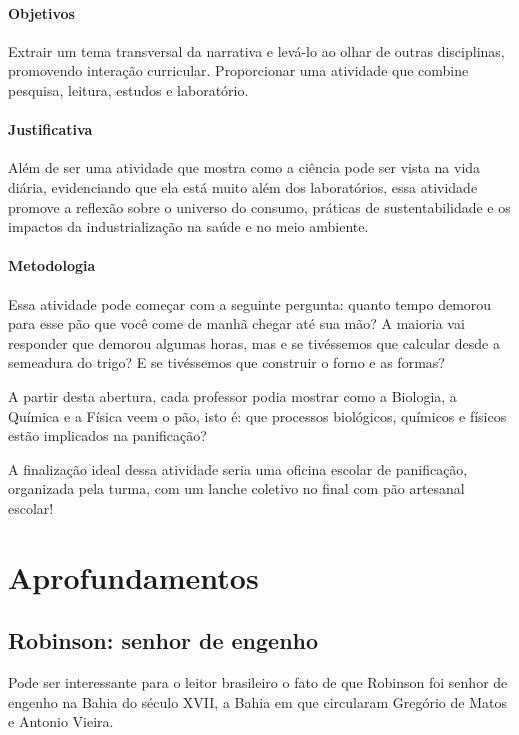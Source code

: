 \documentclass[12pt]{extarticle}
\begin{document}
\paragraph{Objetivos} Extrair um tema transversal da narrativa e
levá-lo ao olhar de outras disciplinas, promovendo interação
curricular. Proporcionar uma atividade que combine pesquisa,
leitura, estudos e laboratório.

\paragraph{Justificativa}

Além de ser uma atividade que mostra como a ciência pode ser vista na vida
diária, evidenciando que ela está muito além dos laboratórios, essa
atividade promove a reflexão sobre o universo do consumo, práticas de
sustentabilidade e os impactos da industrialização na saúde e no meio
ambiente.

\paragraph{Metodologia}
Essa atividade pode começar com a seguinte pergunta: quanto tempo
demorou para esse pão que você come de manhã chegar até sua mão? A
maioria vai responder que demorou algumas horas, mas e se tivéssemos que
calcular desde a semeadura do trigo? E se tivéssemos que construir o
forno e as formas?

A partir desta abertura, cada professor podia mostrar como a Biologia, a
Química e a Física veem o pão, isto é: que processos biológicos,
químicos e físicos estão implicados na panificação?

A finalização ideal dessa atividade seria uma oficina escolar de
panificação, organizada pela turma, com um lanche coletivo no final com
pão artesanal escolar!

\pagebreak\section{Aprofundamentos}

\subsection{Robinson: senhor de engenho}

Pode ser interessante para o leitor brasileiro o fato de que Robinson
foi senhor de engenho na Bahia do século XVII, a Bahia em que circularam
Gregório de Matos e Antonio Vieira.
\end{document}
